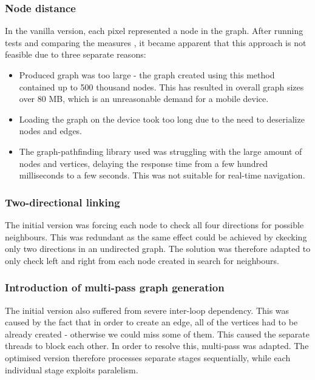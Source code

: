 \documentclass[main.tex]{subfiles}
\begin{document}
	\subsubsection{Node distance}
	In the vanilla version, each pixel represented a node in the graph. After running tests and comparing the measures , it became apparent that this approach is not feasible due to three separate reasons:
	
	\begin{itemize}
		\item Produced graph was too large - the graph created using this method contained up to 500 thousand nodes. This has resulted in overall graph sizes over 80 MB, which is an unreasonable demand for a mobile device.
		\item Loading the graph on the device took too long due to the need to deserialize nodes and edges.
		\item The graph-pathfinding library used was struggling with the large amount of nodes and vertices, delaying the response time from a few hundred milliseconds to a few seconds. This was not suitable for real-time navigation.
	\end{itemize}
	

	\subsubsection{Two-directional linking}
	
	The initial version was forcing each node to check all four directions for possible neighbours. This was redundant as the same effect could be achieved by ckecking only two directions in an undirected graph. The solution was therefore adapted to only check left and right from each node created in search for neighbours.
	\subsubsection{Introduction of multi-pass graph generation}
	The initial version also suffered from severe inter-loop dependency. This was caused by the fact that in order to create an edge, all of the vertices had to be already created - otherwise we could miss some of them. This caused the separate threads to block each other. In order to resolve this, multi-pass was adapted.  The optimised version therefore processes separate stages sequentially, while each individual stage exploits paralelism.
\end{document}
